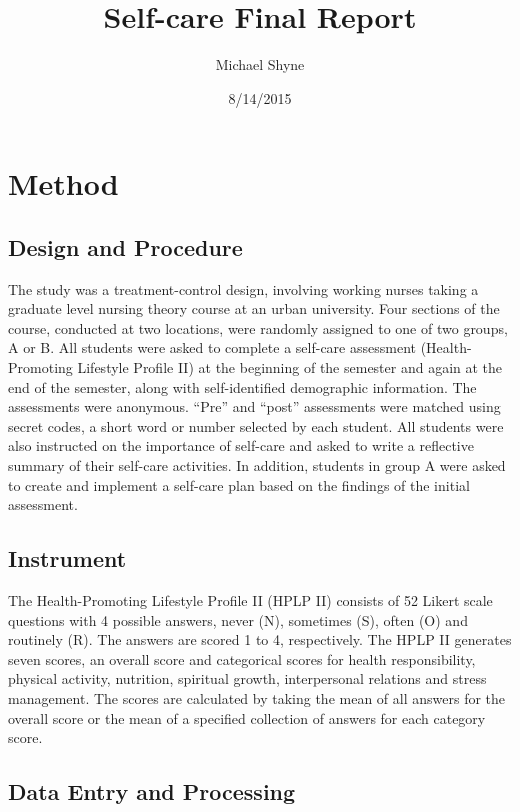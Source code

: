 \documentclass[]{article}
\title{Self-care Final Report}
\author{Michael Shyne}
\date{8/14/2015}
\begin{document}
\maketitle


\section{Method}\label{method}

\subsection{Design and Procedure}\label{design-and-procedure}

The study was a treatment-control design, involving working nurses
taking a graduate level nursing theory course at an urban university.
Four sections of the course, conducted at two locations, were randomly
assigned to one of two groups, A or B. All students were asked to
complete a self-care assessment (Health-Promoting Lifestyle Profile II)
at the beginning of the semester and again at the end of the semester,
along with self-identified demographic information. The assessments were
anonymous. ``Pre'' and ``post'' assessments were matched using secret
codes, a short word or number selected by each student. All students
were also instructed on the importance of self-care and asked to write a
reflective summary of their self-care activities. In addition, students
in group A were asked to create and implement a self-care plan based on
the findings of the initial assessment.

\subsection{Instrument}\label{instrument}

The Health-Promoting Lifestyle Profile II (HPLP II) consists of 52
Likert scale questions with 4 possible answers, never (N), sometimes
(S), often (O) and routinely (R). The answers are scored 1 to 4,
respectively. The HPLP II generates seven scores, an overall score and
categorical scores for health responsibility, physical activity,
nutrition, spiritual growth, interpersonal relations and stress
management. The scores are calculated by taking the mean of all answers
for the overall score or the mean of a specified collection of answers
for each category score.

\subsection{Data Entry and Processing}\label{data-entry-and-processing}
\end{document}
